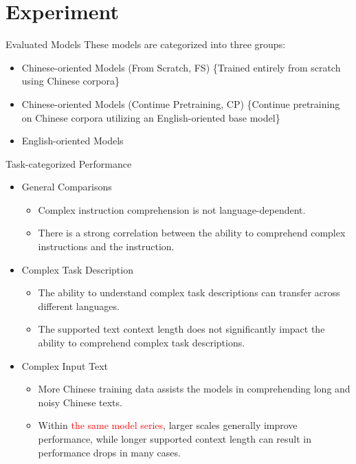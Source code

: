 \documentclass{beamer}
\begin{document}
\section{Experiment}

\begin{frame}{Evaluated Models}
    These models are categorized into three groups:
    \begin{itemize}
        \item {Chinese-oriented Models (From Scratch, FS) \{Trained entirely from scratch using Chinese corpora\}}
        \item {Chinese-oriented Models (Continue Pretraining, CP) \{Continue pretraining on Chinese corpora utilizing an English-oriented base model\}}
        \item {English-oriented Models}
    \end{itemize}
\end{frame}

\begin{frame}{Task-categorized Performance}
    \begin{itemize}
        \item {General Comparisons}
            \begin{itemize}
                \item {Complex instruction comprehension is not language-dependent.}
                \item {There is a strong correlation between the ability to comprehend complex instructions and the instruction.}
            \end{itemize}
        \item {Complex Task Description}
            \begin{itemize}
                \item {The ability to understand complex task descriptions can transfer across different languages.}
                \item {The supported text context length does not significantly impact the ability to comprehend complex task descriptions.}
            \end{itemize}
        \item {Complex Input Text}
            \begin{itemize}
                \item {More Chinese training data assists the models in comprehending long and noisy Chinese texts.}
                \item {Within \textcolor{red}{the same model series}, larger scales generally improve performance, while longer supported context length can result in performance drops in many cases.}
            \end{itemize}
    \end{itemize}
\end{frame}
\end{document}
